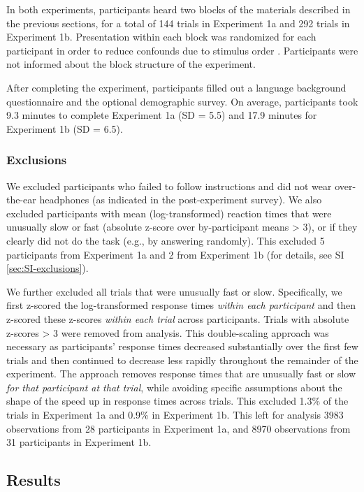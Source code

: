 \documentclass[preprint]{JASA}
\begin{document}
In both experiments, participants heard two blocks of the materials described in the previous sections, for a total of 144 trials in Experiment 1a and 292 trials in Experiment 1b. Presentation within each block was randomized for each participant in order to reduce confounds due to stimulus order \citep[known to affect vowel perception,][ and references therein]{repp-crowder1990}. Participants were not informed about the block structure of the experiment.

After completing the experiment, participants filled out a language background questionnaire and the optional demographic survey. On average, participants took 9.3 minutes to complete Experiment 1a (SD = 5.5) and 17.9 minutes for Experiment 1b (SD = 6.5).

\subsubsection{Exclusions}\label{exclusions}

We excluded participants who failed to follow instructions and did not wear over-the-ear headphones (as indicated in the post-experiment survey). We also excluded participants with mean (log-transformed) reaction times that were unusually slow or fast (absolute z-score over by-participant means \textgreater{} 3), or if they clearly did not do the task (e.g., by answering randomly). This excluded 5 participants from Experiment 1a and 2 from Experiment 1b (for details, see SI \ref{sec:SI-exclusions}).

We further excluded all trials that were unusually fast or slow. Specifically, we first z-scored the log-transformed response times \emph{within each participant} and then z-scored these z-scores \emph{within each trial} across participants. Trials with absolute z-scores \textgreater{} 3 were removed from analysis. This double-scaling approach was necessary as participants' response times decreased substantially over the first few trials and then continued to decrease less rapidly throughout the remainder of the experiment. The approach removes response times that are unusually fast or slow \emph{for that participant at that trial}, while avoiding specific assumptions about the shape of the speed up in response times across trials. This excluded 1.3\% of the trials in Experiment 1a and 0.9\% in Experiment 1b. This left for analysis 3983 observations from 28 participants in Experiment 1a, and 8970 observations from 31 participants in Experiment 1b.

\subsection{Results}\label{sec:experiment-results}
\end{document}
